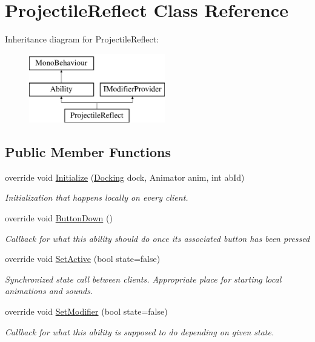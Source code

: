 \hypertarget{class_projectile_reflect}{}\section{Projectile\+Reflect Class Reference}
\label{class_projectile_reflect}
Inheritance diagram for Projectile\+Reflect\+:\begin{figure}[H]
\begin{center}
\leavevmode
\includegraphics[height=3.000000cm]{class_projectile_reflect}
\end{center}
\end{figure}
\subsection*{Public Member Functions}
\begin{DoxyCompactItemize}
\item 
override void \hyperlink{class_projectile_reflect_a5381a035271121930793086fc05f86c4}{Initialize} (\hyperlink{class_docking}{Docking} dock, Animator anim, int ab\+Id)
\begin{DoxyCompactList}\small\item\em Initialization that happens locally on every client. \end{DoxyCompactList}\item 
override void \hyperlink{class_projectile_reflect_a2a01121d450348b198cac9cef206fa29}{Button\+Down} ()
\begin{DoxyCompactList}\small\item\em Callback for what this ability should do once its associated button has been pressed \end{DoxyCompactList}\item 
override void \hyperlink{class_projectile_reflect_a8e25ce526f99de5980cb0bac20dc634c}{Set\+Active} (bool state=false)
\begin{DoxyCompactList}\small\item\em Synchronized state call between clients. Appropriate place for starting local animations and sounds. \end{DoxyCompactList}\item 
override void \hyperlink{class_projectile_reflect_a13bdedc65cb8eed7f5d8a6a733feebe8}{Set\+Modifier} (bool state=false)
\begin{DoxyCompactList}\small\item\em Callback for what this ability is supposed to do depending on given state. \end{DoxyCompactList}\end{DoxyCompactItemize}
